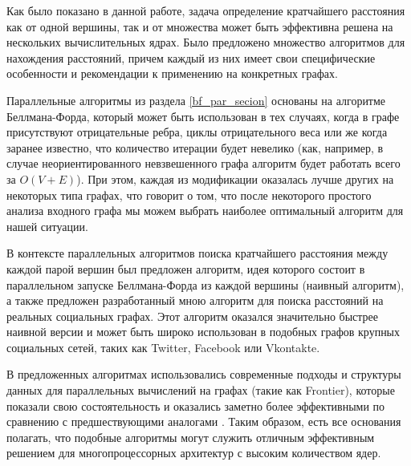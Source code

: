 \startconclusionpage

Как было показано в данной работе, задача определение кратчайшего расстояния как от одной вершины, так и от множества может быть эффективна решена на нескольких вычислительных ядрах. Было предложено множество алгоритмов для нахождения расстояний, причем каждый из них имеет свои специфические особенности и рекомендации к применению на конкретных графах.

Параллельные алгоритмы из раздела \ref{bf_par_secion} основаны на алгоритме Беллмана-Форда, который может быть использован в тех случаях, когда в графе присутствуют отрицательные ребра, циклы отрицательного веса или же когда заранее известно, что количество итерации будет невелико (как, например, в случае неориентированного невзвешенного графа алгоритм будет работать всего за $O(V + E)$). При этом, каждая из модификации оказалась лучше других на некоторых типа графах, что говорит о том, что после некоторого простого анализа входного графа мы можем выбрать наиболее оптимальный алгоритм для нашей ситуации.

В контексте параллельных алгоритмов поиска кратчайшего расстояния между каждой парой вершин был предложен алгоритм, идея которого состоит в параллельном запуске Беллмана-Форда из каждой вершины (наивный алгоритм), а также предложен разработанный мною алгоритм  для поиска расстояний на реальных социальных графах. Этот алгоритм оказался значительно быстрее наивной версии и может быть широко использован в подобных графов крупных социальных сетей, таких как Twitter, Facebook или Vkontakte. 

В предложенных алгоритмах использовались современные подходы и структуры данных для параллельных вычислений на графах (такие как Frontier), которые показали свою состоятельность и оказались заметно более эффективными по сравнению с предшествующими аналогами \cite{LIGRA}. Таким образом, есть все основания полагать, что подобные алгоритмы могут служить отличным эффективным решением для многопроцессорных архитектур с высоким количеством ядер.  

\FloatBarrier
